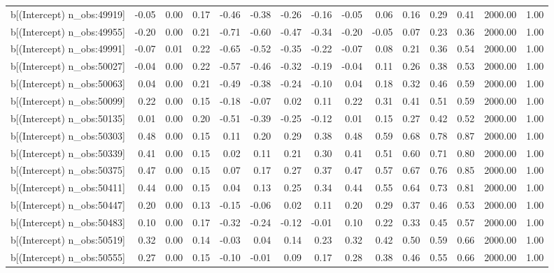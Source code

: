 \begin{table}[ht]
\begin{tabular}{rrrrrrrrrrrrrrr}
  b[(Intercept) n\_obs:49919] & -0.05 & 0.00 & 0.17 & -0.46 & -0.38 & -0.26 & -0.16 & -0.05 & 0.06 & 0.16 & 0.29 & 0.41 & 2000.00 & 1.00 \\ 
  b[(Intercept) n\_obs:49955] & -0.20 & 0.00 & 0.21 & -0.71 & -0.60 & -0.47 & -0.34 & -0.20 & -0.05 & 0.07 & 0.23 & 0.36 & 2000.00 & 1.00 \\ 
  b[(Intercept) n\_obs:49991] & -0.07 & 0.01 & 0.22 & -0.65 & -0.52 & -0.35 & -0.22 & -0.07 & 0.08 & 0.21 & 0.36 & 0.54 & 2000.00 & 1.00 \\ 
  b[(Intercept) n\_obs:50027] & -0.04 & 0.00 & 0.22 & -0.57 & -0.46 & -0.32 & -0.19 & -0.04 & 0.11 & 0.26 & 0.38 & 0.53 & 2000.00 & 1.00 \\ 
  b[(Intercept) n\_obs:50063] & 0.04 & 0.00 & 0.21 & -0.49 & -0.38 & -0.24 & -0.10 & 0.04 & 0.18 & 0.32 & 0.46 & 0.59 & 2000.00 & 1.00 \\ 
  b[(Intercept) n\_obs:50099] & 0.22 & 0.00 & 0.15 & -0.18 & -0.07 & 0.02 & 0.11 & 0.22 & 0.31 & 0.41 & 0.51 & 0.59 & 2000.00 & 1.00 \\ 
  b[(Intercept) n\_obs:50135] & 0.01 & 0.00 & 0.20 & -0.51 & -0.39 & -0.25 & -0.12 & 0.01 & 0.15 & 0.27 & 0.42 & 0.52 & 2000.00 & 1.00 \\ 
  b[(Intercept) n\_obs:50303] & 0.48 & 0.00 & 0.15 & 0.11 & 0.20 & 0.29 & 0.38 & 0.48 & 0.59 & 0.68 & 0.78 & 0.87 & 2000.00 & 1.00 \\ 
  b[(Intercept) n\_obs:50339] & 0.41 & 0.00 & 0.15 & 0.02 & 0.11 & 0.21 & 0.30 & 0.41 & 0.51 & 0.60 & 0.71 & 0.80 & 2000.00 & 1.00 \\ 
  b[(Intercept) n\_obs:50375] & 0.47 & 0.00 & 0.15 & 0.07 & 0.17 & 0.27 & 0.37 & 0.47 & 0.57 & 0.67 & 0.76 & 0.85 & 2000.00 & 1.00 \\ 
  b[(Intercept) n\_obs:50411] & 0.44 & 0.00 & 0.15 & 0.04 & 0.13 & 0.25 & 0.34 & 0.44 & 0.55 & 0.64 & 0.73 & 0.81 & 2000.00 & 1.00 \\ 
  b[(Intercept) n\_obs:50447] & 0.20 & 0.00 & 0.13 & -0.15 & -0.06 & 0.02 & 0.11 & 0.20 & 0.29 & 0.37 & 0.46 & 0.53 & 2000.00 & 1.00 \\ 
  b[(Intercept) n\_obs:50483] & 0.10 & 0.00 & 0.17 & -0.32 & -0.24 & -0.12 & -0.01 & 0.10 & 0.22 & 0.33 & 0.45 & 0.57 & 2000.00 & 1.00 \\ 
  b[(Intercept) n\_obs:50519] & 0.32 & 0.00 & 0.14 & -0.03 & 0.04 & 0.14 & 0.23 & 0.32 & 0.42 & 0.50 & 0.59 & 0.66 & 2000.00 & 1.00 \\ 
  b[(Intercept) n\_obs:50555] & 0.27 & 0.00 & 0.15 & -0.10 & -0.01 & 0.09 & 0.17 & 0.28 & 0.38 & 0.46 & 0.55 & 0.66 & 2000.00 & 1.00 \\ 

\end{tabular}
\end{table}
